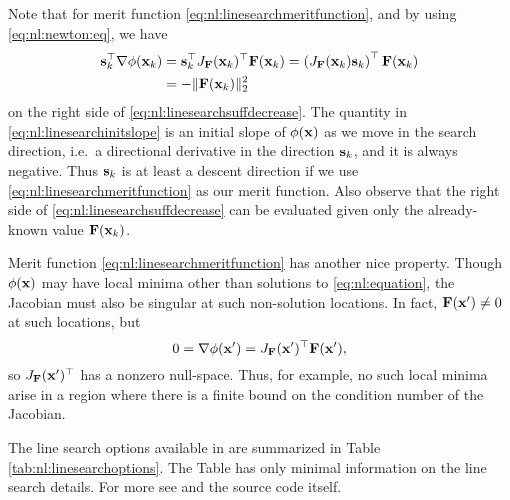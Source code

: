 Note that for merit function \eqref{eq:nl:linesearchmeritfunction}, and by using \eqref{eq:nl:newton:eq}, we have
\begin{align}
\mathbf{s}_k^\top \nabla \phi(\mathbf{x}_k) &= \mathbf{s}_k^\top J_{\mathbf{F}}(\mathbf{x}_k)^\top \mathbf{F}(\mathbf{x}_k) = \left(J_{\mathbf{F}}(\mathbf{x}_k) \mathbf{s}_k\right)^\top \mathbf{F}(\mathbf{x}_k) \label{eq:nl:linesearchinitslope} \\
  &= - \|\mathbf{F}(\mathbf{x}_k)\|_2^2 \notag
\end{align}
on the right side of \eqref{eq:nl:linesearchsuffdecrease}.  The quantity in \eqref{eq:nl:linesearchinitslope} is an initial slope of $\phi(\mathbf{x})$ as we move in the search direction, i.e.~a directional derivative in the direction $\mathbf{s}_k$, and it is always negative.  Thus $\mathbf{s}_k$ is at least a descent direction if we use \eqref{eq:nl:linesearchmeritfunction} as our merit function.  Also observe that the right side of \eqref{eq:nl:linesearchsuffdecrease} can be evaluated given only  the already-known value $\mathbf{F}(\mathbf{x}_k)$.

Merit function \eqref{eq:nl:linesearchmeritfunction} has another nice property.  Though $\phi(\mathbf{x})$ may have local minima other than solutions to \eqref{eq:nl:equation}, the Jacobian must also be singular at such non-solution locations.  In fact, $\mathbf{F}(\mathbf{x}')\ne 0$ at such locations, but
\begin{equation}
0 = \nabla \phi (\mathbf{x}') = J_{\mathbf{F}}(\mathbf{x}')^\top \mathbf{F}(\mathbf{x}'),
\end{equation}
so $J_{\mathbf{F}}(\mathbf{x}')^\top$ has a nonzero null-space.  Thus, for example, no such local minima arise in a region where there is a finite bound on the condition number of the Jacobian.

The line search options available in \PETSc are summarized in Table \ref{tab:nl:linesearchoptions}.  The Table has only minimal information on the line search details.  For more see \citep[Chapter 6]{DennisSchnabel1983} and the \PETSc source code itself.

